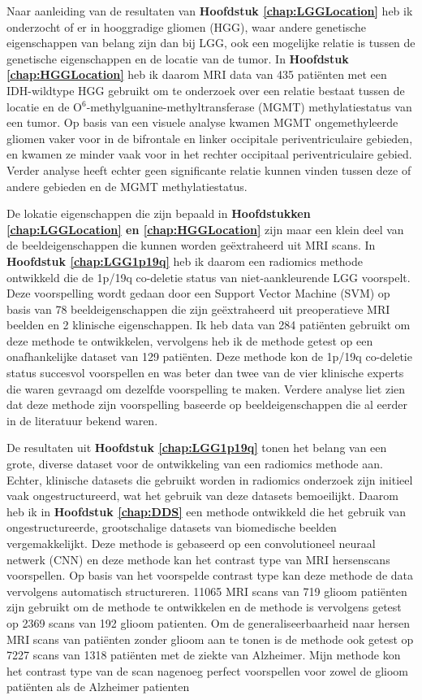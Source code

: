 Naar aanleiding van de resultaten van \textbf{Hoofdstuk \ref{chap:LGGLocation}} heb ik onderzocht of er in hooggradige gliomen (HGG), waar andere genetische eigenschappen van belang zijn dan bij LGG, ook een mogelijke relatie is tussen de genetische eigenschappen en de locatie van de tumor.
In \textbf{Hoofdstuk \ref{chap:HGGLocation}} heb ik daarom MRI data van 435 patiënten met een IDH-wildtype HGG gebruikt om te onderzoek over een relatie bestaat tussen de locatie en de O$^6$-methylguanine-methyltransferase (MGMT) methylatiestatus van een tumor.
Op basis van een visuele analyse kwamen MGMT ongemethyleerde gliomen vaker voor in de bifrontale en linker occipitale periventriculaire gebieden, en kwamen ze minder vaak voor in het rechter occipitaal periventriculaire gebied.
Verder analyse heeft echter geen significante relatie kunnen vinden tussen deze of andere gebieden en de MGMT methylatiestatus.

De lokatie eigenschappen die zijn bepaald in \textbf{Hoofdstukken \ref{chap:LGGLocation} en \ref{chap:HGGLocation}} zijn maar een klein deel van de beeldeigenschappen die kunnen worden geëxtraheerd uit MRI scans.
In \textbf{Hoofdstuk \ref{chap:LGG1p19q}} heb ik daarom een radiomics methode ontwikkeld die de 1p/19q co-deletie status van niet-aankleurende LGG voorspelt.
Deze voorspelling wordt gedaan door een Support Vector Machine (SVM) op basis van 78 beeldeigenschappen die zijn geëxtraheerd uit preoperatieve MRI beelden en 2 klinische eigenschappen.
Ik heb data van 284 patiënten gebruikt om deze methode te ontwikkelen, vervolgens heb ik de methode getest op een onafhankelijke dataset van 129 patiënten.
Deze methode kon de 1p/19q co-deletie status succesvol voorspellen en was beter dan twee van de vier klinische experts die waren gevraagd om dezelfde voorspelling te maken.
Verdere analyse liet zien dat deze methode zijn voorspelling baseerde op beeldeigenschappen die al eerder in de literatuur bekend waren.

De resultaten uit \textbf{Hoofdstuk \ref{chap:LGG1p19q}} tonen het belang van een grote, diverse dataset voor de ontwikkeling van een radiomics methode aan.
Echter, klinische datasets die gebruikt worden in radiomics onderzoek zijn initieel vaak ongestructureerd, wat het gebruik van deze datasets bemoeilijkt.
Daarom heb ik in \textbf{Hoofdstuk \ref{chap:DDS}} een methode ontwikkeld die het gebruik van ongestructureerde, grootschalige datasets van biomedische beelden vergemakkelijkt.
Deze methode is gebaseerd op een convolutioneel neuraal netwerk (CNN) en deze methode kan het contrast type van  MRI hersenscans voorspellen.
Op basis van het voorspelde contrast type kan deze methode de data vervolgens automatisch structureren.
11065 MRI scans van 719 glioom patiënten zijn gebruikt om de methode te ontwikkelen en de methode is vervolgens getest op 2369 scans van 192 glioom patienten.
Om de generaliseerbaarheid naar hersen MRI scans van patiënten zonder glioom aan te tonen is de methode ook getest op 7227 scans van 1318 patiënten met de ziekte van Alzheimer.
Mijn methode kon het contrast type van de scan nagenoeg perfect voorspellen voor zowel de glioom patiënten als de Alzheimer patienten

